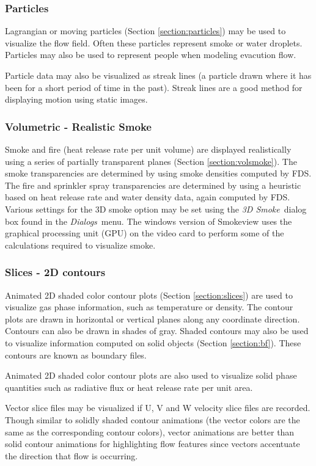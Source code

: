 \documentclass[11pt,twoside]{book}
\begin{document}
\subsubsection{Particles} Lagrangian or moving particles (Section \ref{section:particles}) may be
used to visualize the flow field. Often these particles represent
smoke or water droplets.  Particles may also be used to represent
people when modeling evacution flow.

Particle data may also be visualized as streak lines (a particle
drawn where it has been for a short period of time in the past).
Streak lines are a good method for displaying motion using static
images.

\subsubsection{Volumetric - Realistic Smoke}
Smoke and fire (heat release rate per unit volume) are displayed
realistically using a series of partially transparent planes
(Section \ref{section:volsmoke}). The smoke transparencies are
determined by using smoke densities computed by FDS.  The fire and
sprinkler spray transparencies are determined by using a heuristic
based on heat release rate and water density data, again computed
by FDS. Various settings for the 3D smoke option may be set using
the {\em 3D Smoke}\ dialog box found in the {\em Dialogs}\ menu.
The windows version of Smokeview uses the graphical processing
unit (GPU) on the video card to perform some of the calculations
required to visualize smoke.

\subsubsection{Slices - 2D contours}
Animated 2D shaded color contour plots (Section
\ref{section:slices}) are used to visualize gas phase information,
such as temperature or density. The contour plots are drawn in
horizontal or vertical planes along any coordinate direction.
Contours can also be drawn in shades of gray.
Shaded contours may also be used to visualize information
computed on solid objects (Section \ref{section:bf}).  These contours are known as boundary files.

Animated 2D shaded color contour plots are also used to
visualize solid phase quantities such as radiative flux or
heat release rate per unit area.

Vector slice files may be visualized if U, V and W velocity slice files are recorded.
Though
similar to solidly shaded contour animations (the vector colors are
the same as the corresponding contour colors), vector animations are better
than solid contour animations for highlighting flow
features since vectors accentuate the direction that flow is occurring.
\end{document}
